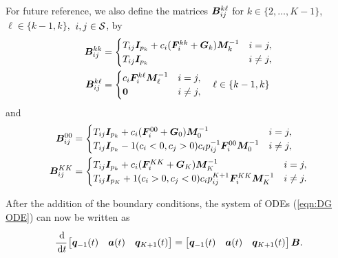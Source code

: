 For future reference, we also define the matrices \({{\boldsymbol B}}^{k\ell}_{ij}\) for \(k\in\{2,\dots,K-1\}\), \(\ell\in\{k-1,k\},\) \(i,j\in\mathcal{S}\), by
\begin{align*}
	{{\boldsymbol B}}^{kk}_{ij} &= \begin{cases}T_{ij}\boldsymbol I_{p_k} + c_i(\boldsymbol F_i^{kk}+\boldsymbol G_k)\boldsymbol M_k^{-1} & i=j,\\T_{ij} \boldsymbol I_{p_k}& i\neq j,\end{cases}
\\	{{\boldsymbol B}}^{k\ell}_{ij} &= \begin{cases}c_i\boldsymbol F_i^{k\ell}\boldsymbol M_\ell^{-1} & i=j,\\\boldsymbol 0 & i\neq j,\end{cases}\quad \ell \in \{k-1,k\}
\end{align*}
and
\begin{align*}
	{{\boldsymbol B}}^{00}_{ij} &= \begin{cases}T_{ij}\boldsymbol I_{p_k} + c_i(\boldsymbol F_i^{00}+\boldsymbol G_0)\boldsymbol M_0^{-1} & i=j,\\T_{ij}\boldsymbol I_{p_k} - 1(c_i<0,c_j>0)c_ip_{ij}^{-1} \boldsymbol F_i^{00}\boldsymbol M_0^{-1} & i\neq j,\end{cases}
\\	{{\boldsymbol B}}^{KK}_{ij} &= \begin{cases}T_{ij}\boldsymbol I_{p_k} + c_i(\boldsymbol F_i^{KK}+\boldsymbol G_K)\boldsymbol M_K^{-1} & i=j,\\T_{ij}\boldsymbol I_{p_K} + 1(c_i>0,c_j<0)c_ip_{ij}^{K+1} \boldsymbol F_i^{KK}\boldsymbol M_K^{-1} & i\neq j.\end{cases}
\end{align*}

After the addition of the boundary conditions, the system of ODEs (\ref{eqn:DG ODE}) can now be written as 
\begin{align}\label{eqn: DG ODE w BCs}
	\cfrac{\, \mathrm{d}}{\, \mathrm{d} t} \begin{bmatrix} \boldsymbol q_{{-1}}(t) & {\boldsymbol a}(t) & \boldsymbol q_{K+1}(t) \end{bmatrix} 
	= \begin{bmatrix} \boldsymbol q_{{-1}}(t) & {\boldsymbol a}(t) & \boldsymbol q_{K+1}(t) \end{bmatrix} \boldsymbol B.
\end{align}

